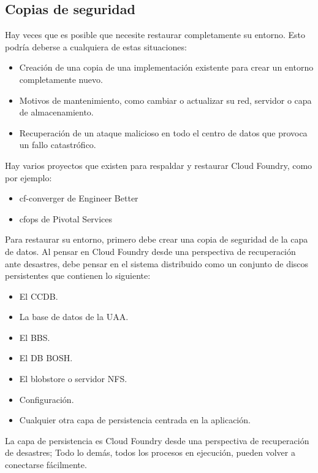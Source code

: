 \documentclass[a4paper,11pt]{article}
\begin{document}
\subsection{Copias de seguridad}
Hay veces que es posible que necesite restaurar completamente su entorno. Esto podría deberse a cualquiera de estas situaciones:
\begin{itemize}
  \item Creación de una copia de una implementación existente para crear un entorno completamente nuevo.
  \item Motivos de mantenimiento, como cambiar o actualizar su red, servidor o capa de almacenamiento.
  \item Recuperación de un ataque malicioso en todo el centro de datos que provoca un fallo catastrófico.
\end{itemize}
Hay varios proyectos que existen para respaldar y restaurar Cloud Foundry, como por ejemplo:
\begin{itemize}
  \item cf-converger de Engineer Better
  \item cfops de Pivotal Services
\end{itemize}
Para restaurar su entorno, primero debe crear una copia de seguridad de la capa de datos. Al pensar en Cloud Foundry desde una perspectiva de recuperación ante desastres, debe pensar en el sistema distribuido como un conjunto de discos persistentes que contienen lo siguiente:
\begin{itemize}
  \item El CCDB.
  \item La base de datos de la UAA.
  \item El BBS.
  \item El DB BOSH.
  \item El blobstore o servidor NFS.
  \item Configuración.
  \item Cualquier otra capa de persistencia centrada en la aplicación.
\end{itemize}
La capa de persistencia es Cloud Foundry desde una perspectiva de recuperación de desastres; Todo lo demás, todos los procesos en ejecución, pueden volver a conectarse fácilmente.
\end{document}
